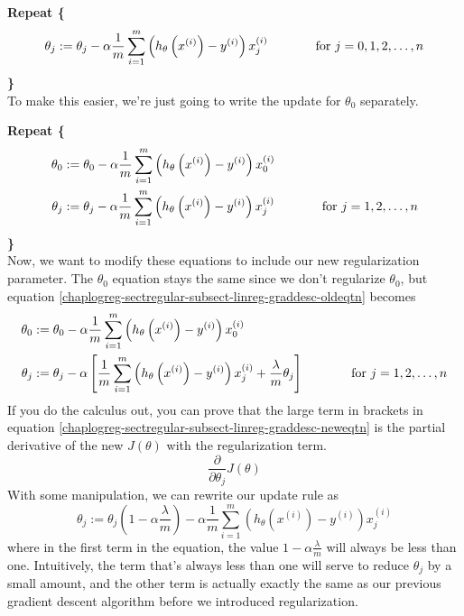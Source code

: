 \textbf{Repeat \{}
$$
\theta_j := \theta_j - \alpha \frac{1}{m} \sum_{i=1}^m \left( h_\theta\left(x^{(i)}\right) - y^{(i)}\right) x_j^{(i)} ~~\mbox{\;\;\;\;\;\;\;\;\;\; for } j = 0, 1, 2, \dots, n
$$
\textbf{\}} \\

\noindent To make this easier, we're just going to write the update for $\theta_0$ separately.

\textbf{Repeat \{}
\begin{subequations}
\begin{align}
\theta_0 &:= \theta_0 - \alpha \frac{1}{m} \sum_{i=1}^m \left( h_\theta\left(x^{(i)}\right) - y^{(i)}\right) x_0^{(i)} \\
\theta_j &:= \theta_j - \alpha \frac{1}{m} \sum_{i=1}^m \left( h_\theta\left(x^{(i)}\right) - y^{(i)}\right) x_j^{(i)} ~~\mbox{\;\;\;\;\;\;\;\;\;\; for } j = 1, 2, \dots, n \label{chaplogreg-sectregular-subsect-linreg-graddesc-oldeqtn}
\end{align}
\end{subequations}
\textbf{\}} \\
Now, we want to modify these equations to include our new regularization parameter. The $\theta_0$ equation stays the same since we don't regularize $\theta_0$, but equation \ref{chaplogreg-sectregular-subsect-linreg-graddesc-oldeqtn} becomes
\begin{subequations}
\begin{align}
\theta_0 &:= \theta_0 - \alpha \frac{1}{m} \sum_{i=1}^m \left( h_\theta\left(x^{(i)}\right) - y^{(i)}\right) x_0^{(i)} \\
\theta_j &:= \theta_j - \alpha \left[\frac{1}{m} \sum_{i=1}^m \left( h_\theta\left(x^{(i)}\right) - y^{(i)}\right) x_j^{(i)} + \frac{\lambda}{m}\theta_j \right] ~~\mbox{\;\;\;\;\;\;\;\;\;\; for } j = 1, 2, \dots, n \label{chaplogreg-sectregular-subsect-linreg-graddesc-neweqtn}
\end{align}
\end{subequations}
If you do the calculus out, you can prove that the large term in brackets in equation \ref{chaplogreg-sectregular-subsect-linreg-graddesc-neweqtn} is the partial derivative of the new $J\left(\theta\right)$ with the regularization term. 
$$
\frac{\partial}{\partial \theta_j} J\left(\theta\right)
$$
With some manipulation, we can rewrite our update rule as
\begin{equation}
\theta_j := \theta_j\left(1 - \alpha\frac{\lambda}{m}\right) - \alpha\frac{1}{m}\sum_{i=1}^m \left(h_\theta\left(x^{(i)}\right) - y^{(i)}\right) x_j^{(i)}
\end{equation}
where in the first term in the equation, the value $1 - \alpha\frac{\lambda}{m}$ will always be less than one. Intuitively, the term that's always less than one will serve to reduce $\theta_j$ by a small amount, and the other term is actually exactly the same as our previous gradient descent algorithm before we introduced regularization. 

